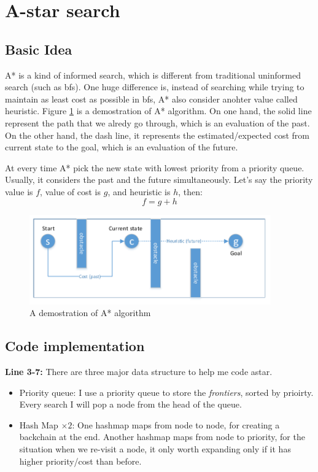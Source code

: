 \section{A-star search}
\subsection{Basic Idea}

A* is a kind of informed search, which is different from traditional uninformed search (such as bfs). One huge difference is, instead of searching while trying to maintain as least cost as possible in bfs, A* also consider anohter value called heuristic. Figure \ref{astar} is a demostration of A* algorithm. On one hand, the solid line represent the path that we alredy go through, which is an evaluation of the past. On the other hand, the dash line, it represents the estimated/expected cost from current state to the goal, which is an evaluation of the future. 

At every time A* pick the new state with lowest priority from a priority queue. Usually, it considers the past and the future simultaneously. Let's say the priority value is $f$, value of cost is $g$, and heuristic is $h$, then:
$$f = g + h$$

\begin{figure}[!h]
\centering
\includegraphics[width=0.927\textwidth]{astar.pdf}
\caption{A demostration of A* algorithm}
\label{astar}
\end{figure}



\subsection{Code implementation}
\textbf{Line 3-7:} There are three major data structure to help me code astar.
\begin{itemize}
  \item Priority queue: I use a priority queue to store the \emph{frontiers}, sorted by prioirty. Every search I will pop a node from the head of the queue. 
  \item Hash Map $\times 2$: One hashmap maps from node to node, for creating a backchain at the end. Another hashmap maps from node to priority, for the situation when we re-visit a node, it only worth expanding only if it has higher priority/cost than before.
\end{itemize}

